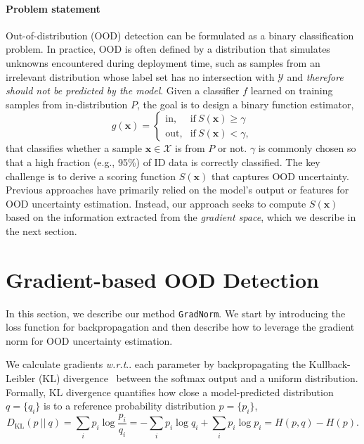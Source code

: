\documentclass{article}
\makeatletter
\def\*#1{\mathbf{#1}}
\DeclareRobustCommand\onedot{\futurelet\@let@token\@onedot}
\def\@onedot{\ifx\@let@token.\else.\null\fi\xspace}
\def\wrt{\emph{w.r.t}\onedot} \def\dof{d.o.f\onedot}
\makeatother
\begin{document}
\vspace{-0.2cm}
\paragraph{Problem statement}
Out-of-distribution (OOD) detection can be formulated as a binary classification problem. In practice, OOD is often defined by a distribution that simulates unknowns encountered during deployment time, such as samples from an irrelevant distribution whose label set has no intersection with $\mathcal{Y}$ and \emph{therefore should not be predicted by the model}.  Given a classifier $f$ learned on training samples from in-distribution $P$, the goal is to design a binary function estimator,
\begin{equation*}
    g(\*x) = 
    \begin{cases}
    \text{in}, &\text{if}\ S(\*x) \geq \gamma \\
    \text{out}, &\text{if}\ S(\*x) < \gamma,
    \end{cases}
\end{equation*}
that classifies whether a sample $\*x\in \mathcal{X}$ is from $P$ or not. $\gamma$ is commonly chosen so that a high fraction (e.g., 95\%) of ID data is correctly classified. The key challenge is to derive a scoring function $S(\*x)$ that captures OOD uncertainty. Previous approaches have primarily relied on the model's output or features for OOD uncertainty estimation. Instead, our approach seeks to compute $S(\*x)$ based on the information extracted from the \emph{gradient space}, which we describe in the next section.




\section{Gradient-based OOD Detection}
\label{sec:method}


In this section, we describe our  method \texttt{GradNorm}. We start by introducing the loss function for backpropagation and then describe how to leverage the gradient norm for OOD uncertainty estimation.










We calculate gradients \wrt each parameter by backpropagating the Kullback-Leibler (KL) divergence~\cite{kullback1951information} between the softmax output and a uniform distribution. Formally, KL divergence quantifies how close a model-predicted distribution $q=\{q_i\}$ is to a reference probability distribution $p=\{p_i\}$,
\begin{equation}
    D_\text{KL} (p~||~q) = \sum_i p_i \log \frac{p_i}{q_i} = -\sum_i p_i \log q_i + \sum_i p_i \log p_i  = H(p,q) - H(p).
\end{equation}
\end{document}
